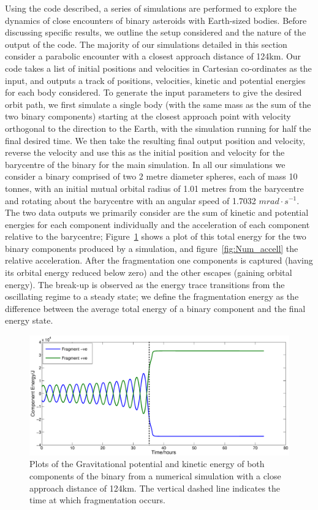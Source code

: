 \documentclass[letterpaper, preprint, paper,11pt]{AAS}	%
\begin{document}
Using the code described, a series of simulations are performed to explore the dynamics of close encounters of binary asteroids with Earth-sized bodies. Before discussing specific results, we outline the setup considered and the nature of the output of the code.
The majority of our simulations detailed in this section consider a parabolic encounter with a closest approach distance of 124km. Our code takes a list of initial positions and velocities in Cartesian co-ordinates as the input, and outputs a track of positions, velocities, kinetic and potential energies for each body considered. To generate the input parameters to give the desired orbit path, we first simulate a single body (with the same mass as the sum of the two binary components) starting at the closest approach point with velocity orthogonal to the direction to the Earth, with the simulation running for half the final desired time. We then take the resulting final output position and velocity, reverse the velocity and use this as the initial position and velocity for the barycentre of the binary for the main simulation. In all our simulations we consider a binary comprised of two 2 metre diameter spheres, each of mass 10 tonnes, with an initial mutual orbital radius of 1.01 metres from the barycentre and rotating about the barycentre with an angular speed of 1.7032  $mrad\cdot s^{-1}$.
The two data outputs we primarily consider are the sum of kinetic and potential energies for each component individually and the acceleration of each component relative to the barycentre;  Figure~\ref{fig:Num_energy} shows a plot of this total energy for the two binary components produced by a simulation, and  figure~\ref{fig:Num_accell} the relative acceleration. After the fragmentation one components is captured (having its orbital energy reduced below zero) and the other escapes (gaining orbital energy). The break-up is observed as the energy trace transitions from the oscillating regime to a steady state; we define the fragmentation energy as the difference between the average total energy of a binary component and the final energy state.
\begin{figure}[H]
\centering
\centerline{\includegraphics[width=1.2\textwidth]{binary_num.eps}} 
\caption{Plots of the Gravitational potential and kinetic energy of both components of the binary from a numerical simulation with a close approach distance of 124km. The vertical dashed line indicates the time at which fragmentation occurs.} 
\label{fig:Num_energy}
\end{figure}
\end{document}
